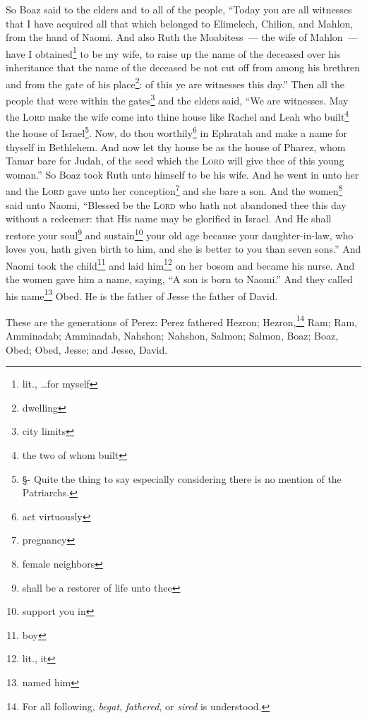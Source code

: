 \begin{inparaenum}
     So Boaz said to the elders and to all of the people, ``Today you are all witnesses that I have acquired all that which belonged to Elimelech, Chilion, and Mahlon, from the hand of Naomi.%
     And also Ruth the Moabitess~--- the wife of Mahlon~--- have I obtained\footnote{lit., \dots for myself} to be my wife, to raise up the name of the deceased over his inheritance that the name of the deceased be not cut off from among his brethren and from the gate of his place\footnote{dwelling}: of this ye are witnesses this day.''%
     Then all the people that were within the gates\footnote{city limits} and the elders said, ``We are witnesses. May the \textsc{Lord} make the wife come into thine house like Rachel and Leah who built\footnote{the two of whom built} the house of Israel\footnote{\S - Quite the thing to say especially considering there is no mention of the Patriarchs.}. Now, do thou worthily\footnote{act virtuously} in Ephratah and make a name for thyself in Bethlehem.%
     And now let thy house be as the house of Pharez, whom Tamar bare for Judah, of the seed which the \textsc{Lord} will give thee of this young woman.''%
     So Boaz took Ruth unto himself to be his wife. And he went in unto her and the \textsc{Lord} gave unto her conception\footnote{pregnancy} and she bare a son.%
     And the women\footnote{female neighbors} said unto Naomi, ``Blessed be the \textsc{Lord} who hath not abandoned thee this day without a redeemer: that His name may be glorified in Israel.%
     And He shall restore your soul\footnote{shall be a restorer of life unto thee} and sustain\footnote{support you in} your old age because your daughter-in-law, who loves you, hath given birth to him, and she is better to you than seven sons.''%
     And Naomi took the child\footnote{boy} and laid him\footnote{lit., it} on her bosom and became his nurse.%
     And the women gave him a name, saying, ``A son is born to Naomi.'' And they called his name\footnote{named him} Obed. He is the father of Jesse the father of David.%
    
     These are the generations of Perez: Perez fathered Hezron;%
     Hezron,\footnote{For all following, \textit{begat}, \textit{fathered}, or \textit{sired} is understood.} Ram; Ram, Amminadab;%
     Amminadab, Nahshon; Nahshon, Salmon;%
     Salmon, Boaz; Boaz, Obed;%
     Obed, Jesse; and Jesse, David.%
\end{inparaenum}

